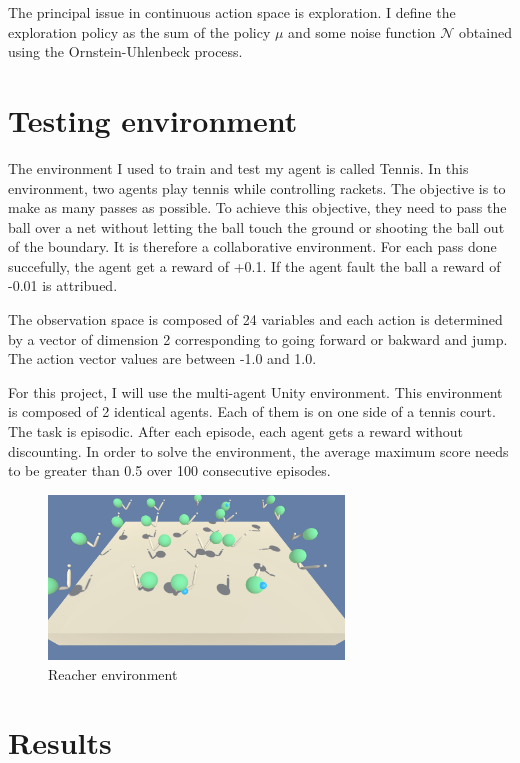 \documentclass[12pt]{article}
\begin{document}
The principal issue in continuous action space is exploration. I define the exploration policy as the sum of the policy $\mu$ and some noise function $\mathcal{N}$ obtained using the Ornstein-Uhlenbeck process.


\section{Testing environment}
The environment I used to train and test my agent is called Tennis. In this environment, two agents play tennis while controlling rackets. The objective is to make as many passes as possible. To achieve this objective, they need to pass the ball over a net without letting the ball touch the ground or shooting the ball out of the boundary. It is therefore a collaborative environment. For each pass done succefully, the agent get a reward of +0.1. If the agent fault the ball a reward of -0.01 is attribued.

The observation space is composed of 24 variables and each action is determined by a vector of dimension 2 corresponding to going forward or bakward and jump. The action vector values are between -1.0 and 1.0.

For this project, I will use the multi-agent Unity environment. This environment is composed of 2 identical agents. Each of them is on one side of a tennis court. The task is episodic. After each episode, each agent gets a reward without discounting.  In order to solve the environment, the average maximum score needs to be greater than 0.5 over 100 consecutive episodes.

\begin{center}
\begin{figure}[H]
  \center
  \includegraphics[width=0.7\textwidth]{../PNG/env.png}
  \caption{Reacher environment}
  \label{fig:reacher_environment}
\end{figure}
\end{center}


\section{Results}
\end{document}
